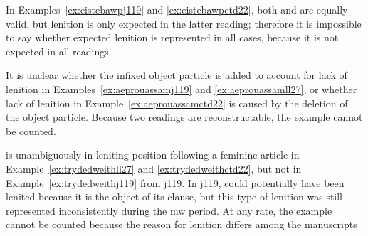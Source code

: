 \begin{mwl}
\end{mwl}
In Examples~\ref{ex:eistebawpj119} and \ref{ex:eistebawpctd22}, both  and  are equally valid, but lenition is only expected in the latter reading; therefore it is impossible to say whether expected lenition is represented in all cases, because it is not expected in all readings.
\begin{mwl}
\end{mwl}
It is unclear whether the infixed object particle  is added to account for lack of lenition in Examples~\ref{ex:aeprouassamj119} and \ref{ex:aeprouassamll27}, or whether lack of lenition in Example~\ref{ex:aeprouassamctd22} is caused by the deletion of the object particle. Because two readings are reconstructable, the example cannot be counted.

\begin{mwl}
\end{mwl}
 is unambiguously in leniting position following a feminine article in Example~\ref{ex:trydedweithll27} and \ref{ex:trydedweithctd22}, but not in Example~\ref{ex:trydedweithj119} from \gls{j119}. In \gls{j119},  could potentially have been lenited because it is the object of its clause, but this type of lenition was still represented inconsistently during the \gls{mw} period. At any rate, the example cannot be counted because the reason for lenition differs among the manuscripts

